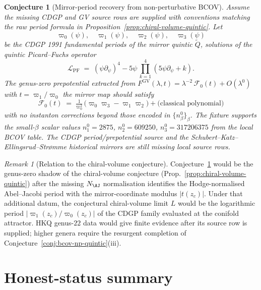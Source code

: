 \documentclass[12pt]{amsart}
\newtheorem{conj}[thm]{Conjecture}
\theoremstyle{remark}
\newtheorem{rmk}[thm]{Remark}
\begin{document}
\begin{conj}[Mirror-period recovery from non-perturbative BCOV]
  \label{conj:mirror-period-recovery}
  Assume the missing CDGP and GV source rows are supplied with conventions
  matching the raw period formula in
  Proposition~\ref{prop:chiral-volume-quintic}.
  Let
  \[
    \varpi_0(\psi),\quad \varpi_1(\psi),\quad
    \varpi_2(\psi),\quad \varpi_3(\psi)
  \]
  be the CDGP 1991 fundamental periods of the mirror quintic
  $\widetilde Q$, solutions of the quintic Picard--Fuchs operator
  \[
    \mathcal{L}_{\mathrm{PF}} \;=\; (\psi \partial_\psi)^4
      - 5\psi\, \prod_{k = 1}^{4} (5 \psi \partial_\psi + k).
  \]
  The genus-zero prepotential extracted from
  $F^{\mathrm{GV}}(\lambda, t) = \lambda^{-2}\, \mathcal{F}_0(t) + O(\lambda^0)$
  with $t = \varpi_1 / \varpi_0$ the mirror map should satisfy
  \[
    \mathcal{F}_0(t) \;=\; \tfrac{1}{\varpi_0^2}\,
      \bigl(\varpi_0 \varpi_3 - \varpi_1 \varpi_2\bigr)
      + \text{(classical polynomial)}
  \]
  with no instanton corrections beyond those encoded in
  $\{n_\beta^0\}_\beta$. The fixture supports the small-\(\beta\) scalar
  values $n_1^0 = 2875$, $n_2^0 = 609250$, $n_3^0 = 317206375$ from the
  local BCOV table. The CDGP period/prepotential source and the
  Schubert--Katz--Ellingsrud--Str\o mme historical mirrors are still
  missing local source rows.
\end{conj}

\begin{rmk}[Relation to the chiral-volume conjecture]
  Conjecture~\ref{conj:mirror-period-recovery} would be the genus-zero
  shadow of the chiral-volume conjecture
  (Prop.~\ref{prop:chiral-volume-quintic}) after the missing
  \(N_{\AJ}\) normalisation identifies the Hodge-normalised
  Abel--Jacobi period with the mirror-coordinate modulus $|t(z_c)|$.
  Under that additional datum, the conjectural chiral-volume limit \(L\)
  would be the logarithmic period
  $|\varpi_1(z_c)/\varpi_0(z_c)|$ of the CDGP family evaluated at the
  conifold attractor. HKQ genus-\(22\) data would give finite evidence
  after its source row is supplied; higher genera require the resurgent
  completion of
  Conjecture~\ref{conj:bcov-np-quintic}(iii).
\end{rmk}

\section{Honest-status summary}
\end{document}
